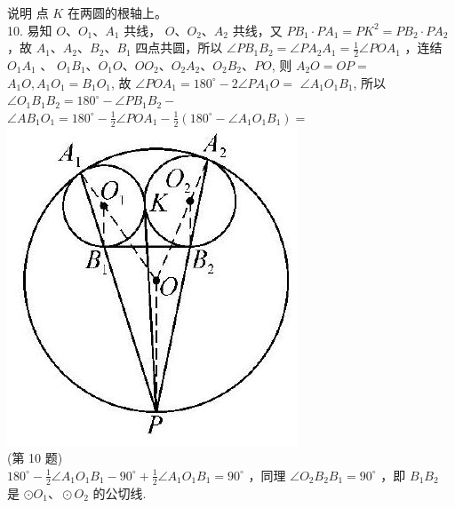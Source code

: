 \documentclass[10pt]{article}
\begin{document}
说明 点 $K$ 在两圆的根轴上。\\
10. 易知 $O 、 O_{1} 、 A_{1}$ 共线， $O 、 O_{2} 、 A_{2}$ 共线，又 $P B_{1} \cdot P A_{1}=P K^{2}=P B_{2} \cdot P A_{2}$ ，故 $A_{1} 、 A_{2} 、 B_{2} 、 B_{1}$ 四点共圆，所以 $\angle P B_{1} B_{2}=\angle P A_{2} A_{1}=\frac{1}{2} \angle P O A_{1}$ ，连结 $O_{1} A_{1}$ 、 $O_{1} B_{1} 、 O_{1} O 、 O O_{2} 、 O_{2} A_{2} 、 O_{2} B_{2} 、 P O$, 则 $A_{2} O=O P=$ $A_{1} O, A_{1} O_{1}=B_{1} O_{1}$, 故 $\angle P O A_{1}=180^{\circ}-2 \angle P A_{1} O=$ $\angle A_{1} O_{1} B_{1}$, 所以 $\angle O_{1} B_{1} B_{2}=180^{\circ}-\angle P B_{1} B_{2}-$ $\angle A B_{1} O_{1}=180^{\circ}-\frac{1}{2} \angle P O A_{1}-\frac{1}{2}\left(180^{\circ}-\angle A_{1} O_{1} B_{1}\right)=$\\
\includegraphics[max width=\textwidth, center]{2024_10_30_66b8e5e701da2093c133g-102}\\
(第 10 题)\\
$180^{\circ}-\frac{1}{2} \angle A_{1} O_{1} B_{1}-90^{\circ}+\frac{1}{2} \angle A_{1} O_{1} B_{1}=90^{\circ}$ ，同理 $\angle O_{2} B_{2} B_{1}=90^{\circ}$ ，即 $B_{1} B_{2}$ 是 $\odot O_{1} 、 \odot O_{2}$ 的公切线.
\end{document}
